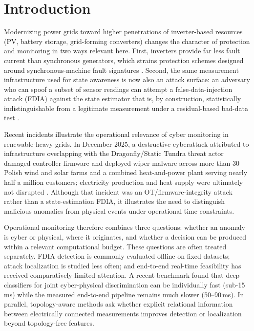 \documentclass[conference]{IEEEtran}
\begin{document}
\section{Introduction}

Modernizing power grids toward higher penetrations of inverter-based resources (PV, battery storage, grid-forming converters) changes the character of protection and monitoring in two ways relevant here. First, inverters provide far less fault current than synchronous generators, which strains protection schemes designed around synchronous-machine fault signatures \cite{liaqat2026protection}. Second, the same measurement infrastructure used for state awareness is now also an attack surface: an adversary who can spoof a subset of sensor readings can attempt a false-data-injection attack (FDIA) against the state estimator that is, by construction, statistically indistinguishable from a legitimate measurement under a residual-based bad-data test \cite{liu2011false}.

Recent incidents illustrate the operational relevance of cyber monitoring in renewable-heavy grids. In December 2025, a destructive cyberattack attributed to infrastructure overlapping with the Dragonfly/Static Tundra threat actor damaged controller firmware and deployed wiper malware across more than 30 Polish wind and solar farms and a combined heat-and-power plant serving nearly half a million customers; electricity production and heat supply were ultimately not disrupted \cite{certpolska2026incident}. Although that incident was an OT/firmware-integrity attack rather than a state-estimation FDIA, it illustrates the need to distinguish malicious anomalies from physical events under operational time constraints.

Operational monitoring therefore combines three questions: whether an anomaly is cyber or physical, where it originates, and whether a decision can be produced within a relevant computational budget. These questions are often treated separately. FDIA detection is commonly evaluated offline on fixed datasets; attack localization is studied less often; and end-to-end real-time feasibility has received comparatively limited attention. A recent benchmark \cite{abukhousa2026latency} found that deep classifiers for joint cyber-physical discrimination can be individually fast (sub-15\,ms) while the measured end-to-end pipeline remains much slower (50--90\,ms). In parallel, topology-aware methods ask whether explicit relational information between electrically connected measurements improves detection or localization beyond topology-free features.
\end{document}
